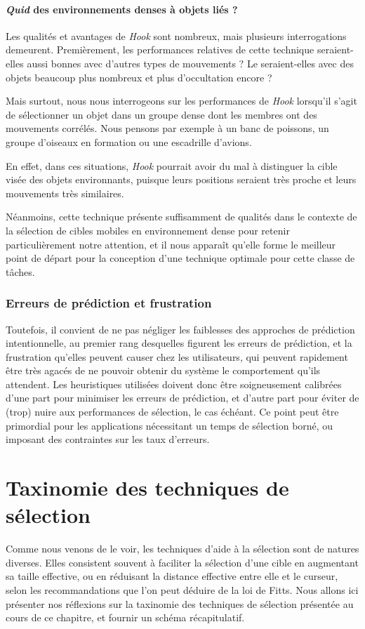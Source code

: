 	\paragraph{\emph{Quid} des environnements denses à objets liés ?}
	Les qualités et avantages de \emph{Hook} sont nombreux, mais plusieurs interrogations demeurent. Premièrement, les performances relatives de cette technique seraient-elles aussi bonnes avec d'autres types de mouvements ? Le seraient-elles avec des objets beaucoup plus nombreux et plus d'occultation encore ?
	
	Mais surtout, nous nous interrogeons sur les performances de \emph{Hook} lorsqu'il s'agit de sélectionner un objet dans un groupe dense dont les membres ont des mouvements corrélés. Nous pensons par exemple à un banc de poissons, un groupe d'oiseaux en formation ou une escadrille d'avions.
	
	En effet, dans ces situations, \emph{Hook} pourrait avoir du mal à distinguer la cible visée des objets environnants, puisque leurs positions seraient très proche et leurs mouvements très similaires.
	
	Néanmoins, cette technique présente suffisamment de qualités dans le contexte de la sélection de cibles mobiles en environnement dense pour retenir particulièrement notre attention, et il nous apparaît qu'elle forme le meilleur point de départ pour la conception d'une technique optimale pour cette classe de tâches.
	
	\subsubsection{Erreurs de prédiction et frustration}
	Toutefois, il convient de ne pas négliger les faiblesses des approches de prédiction intentionnelle, au premier rang desquelles figurent les erreurs de prédiction, et la frustration qu'elles peuvent causer chez les utilisateurs, qui peuvent rapidement être très agacés de ne pouvoir obtenir du système le comportement qu'ils attendent. Les heuristiques utilisées doivent donc être soigneusement calibrées d'une part pour minimiser les erreurs de prédiction, et d'autre part pour éviter de (trop) nuire aux performances de sélection, le cas échéant. Ce point peut être primordial pour les applications nécessitant un temps de sélection borné, ou imposant des contraintes sur les taux d'erreurs.
	
\section{Taxinomie des techniques de sélection}
    Comme nous venons de le voir, les techniques d'aide à la sélection sont de natures diverses. Elles consistent souvent à faciliter la sélection d'une cible en augmentant sa taille effective, ou en réduisant la distance effective entre elle et le curseur, selon les recommandations que l'on peut déduire de la loi de Fitts. Nous allons ici présenter nos réflexions sur la taxinomie des techniques de sélection présentée au cours de ce chapitre, et fournir un schéma récapitulatif.
    
